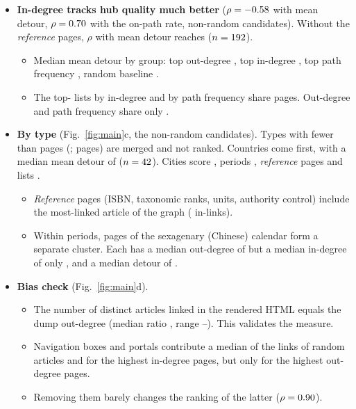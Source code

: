\documentclass[10pt,a4paper]{article}
\begin{document}
\begin{itemize}
\begin{itemize}
    \RhoOutDetourInGrpIn, top path frequency \RhoOutDetourInGrpPath, random articles
    \RhoOutDetourInGrpRandom{} ($n=\RhoOutDetourInGrpRandomN$). Pooling the
    \RhoOutDetourN{} non-random candidates gives $\rho=\RhoOutDetour$; the sign comes from the
    way the lists were built, so we report the per-list values instead.
  \end{itemize}
\item \textbf{In-degree tracks hub quality much better} ($\rho=-0.58$ with mean detour,
  $\rho=0.70$ with the on-path rate, \RhoInDetourN{} non-random candidates). Without the
  \NReferenceCandidates{} \emph{reference} pages, $\rho$ with mean detour reaches
  \RhoInDetourNoRef{} ($n=192$).  \begin{itemize}
  \item Median mean detour by group: top out-degree \GrpOutMedDetour, top in-degree
    \GrpInMedDetour, top path frequency \GrpPathMedDetour, random baseline \GrpRandomMedDetour.
  \item The top-\TopK{} lists by in-degree and by path frequency share \OverlapInPath{} pages.
    Out-degree and path frequency share only \OverlapOutPath.
  \end{itemize}
\item \textbf{By type} (Fig.~\ref{fig:main}c, the \RhoOutDetourN{} non-random candidates). Types
  with fewer than \MinTypeSize{} pages (\SmallTypesList; \NSmallTypePages{} pages) are merged and
  not ranked. Countries come first, with a median mean detour of \TypeCountryMedDetour{}
  ($n=42$). Cities score \TypeCityMedDetour, periods \TypePeriodMedDetour,
  \emph{reference} pages \TypeReferenceMedDetour{} and lists \TypeListMedDetour.
  \begin{itemize}
  \item \emph{Reference} pages (ISBN, taxonomic ranks, units, authority control) include the
    most-linked article of the graph (\MaxInDeg{} in-links).
  \item Within periods, \NSexagenary{} pages of the sexagenary (Chinese) calendar form a separate
    cluster. Each has a median out-degree of \SexagenaryMedOutDeg{} but a median in-degree of only
    \SexagenaryMedInDeg, and a median detour of \SexagenaryMedDetour.
  \end{itemize}
\item \textbf{Bias check} (Fig.~\ref{fig:main}d).
  \begin{itemize}
  \item The number of distinct articles linked in the rendered HTML equals the dump out-degree
    (median ratio \BiasRatioMed, range \BiasRatioMin--\BiasRatioMax). This validates the measure.
  \item Navigation boxes and portals contribute a median \BiasRandomMedShare{} of the links of
    random articles and \BiasInMedShare{} for the highest in-degree pages, but only
    \BiasTopMedShare{} for the highest out-degree pages.
  \item Removing them barely changes the ranking of the latter ($\rho=0.90$).
  \end{itemize}
\end{itemize}
\end{document}
